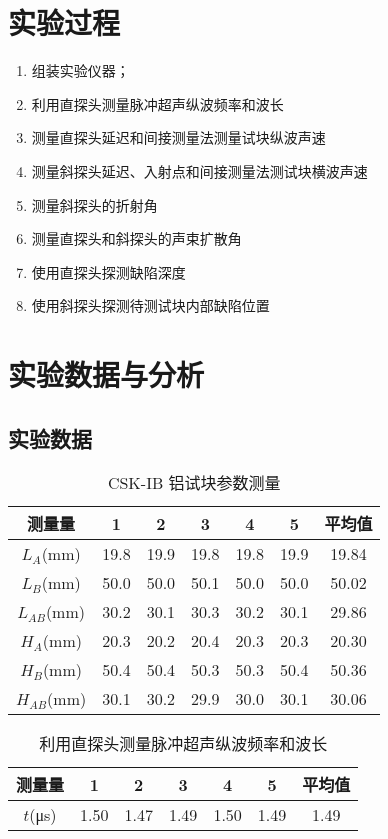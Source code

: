 \section{实验过程}%
    \begin{enumerate}
        \item 组装实验仪器；
        \item 利用直探头测量脉冲超声纵波频率和波长
        \item 测量直探头延迟和间接测量法测量试块纵波声速
        \item 测量斜探头延迟、入射点和间接测量法测试块横波声速
        \item 测量斜探头的折射角
        \item 测量直探头和斜探头的声束扩散角
        \item 使用直探头探测缺陷深度
        \item 使用斜探头探测待测试块内部缺陷位置
    \end{enumerate}
\section{实验数据与分析}
\subsection{实验数据\label{sss:data}}
\begin{table}[!ht]
    \caption{CSK-IB 铝试块参数测量}\label{tab:A7.length}
    \begin{tabularx}{\textwidth}{*{7}{C}} \toprule
        测量量 & 1 & 2 & 3 & 4 & 5 & 平均值 \\ \midrule
        $L_A$(\unit{\mm}) & 19.8 & 19.9 & 19.8 & 19.8 & 19.9 & 19.84 \\ 
        $L_B$(\unit{\mm}) & 50.0 & 50.0 & 50.1 & 50.0 & 50.0 & 50.02 \\ 
        $L_{AB}$(\unit{\mm}) & 30.2 & 30.1 & 30.3 & 30.2 & 30.1 & 29.86 \\[2mm]
        $H_A$(\unit{\mm}) & 20.3 & 20.2 & 20.4 & 20.3 & 20.3 & 20.30 \\
        $H_B$(\unit{\mm}) & 50.4 & 50.4 & 50.3 & 50.3 & 50.4 & 50.36 \\
        $H_{AB}$(\unit{\mm}) & 30.1 & 30.2 & 29.9 & 30.0 & 30.1 & 30.06 \\ \bottomrule
    \end{tabularx}
\end{table}

\begin{table}[!ht]
    \caption{利用直探头测量脉冲超声纵波频率和波长}\label{tab:A7.exp1}
    \begin{tabularx}{\textwidth}{*{7}{C}} \toprule
        测量量 & 1 & 2 & 3 & 4 & 5 & 平均值 \\ \midrule
        $t$(\unit{\us}) & 1.50 & 1.47 & 1.49 & 1.50 & 1.49 & 1.49 \\ \bottomrule
    \end{tabularx}
\end{table}

